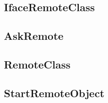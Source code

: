 \documentclass[12pt,journal,compsoc]{IEEEtran}
\begin{document}
\newpage
\onecolumn
{}
\label{appendix:codigo-java}

\subsection{IfaceRemoteClass}
\label{section:IfaceRemoteClass}


\subsection{AskRemote}
\label{section:AskRemote}


\subsection{RemoteClass}
\label{section:RemoteClass}


\subsection{StartRemoteObject}
\label{section:StartRemoteObject}


\ifCLASSOPTIONcaptionsoff
  \newpage
\fi
\end{document}
